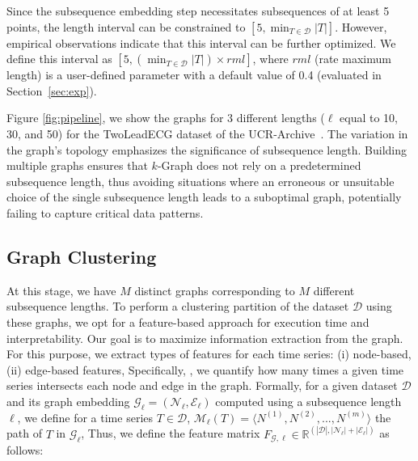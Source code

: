 Since the subsequence embedding step necessitates subsequences of at least 5 points, the length interval can be constrained to $[5, \min_{T \in \mathcal{D}} |T|]$. 
However, empirical observations indicate that this interval can be further optimized. We define this interval as $[5, ( \min_{T \in \mathcal{D}} |T|) \times rml]$, where $rml$ (rate maximum length) is a user-defined parameter with a default value of 0.4 
(evaluated in Section~\ref{sec:exp}).

Figure \ref{fig:pipeline}, we show the graphs for $3$ different lengths ($\ell$ equal to 10, 30, and 50) for the TwoLeadECG dataset of the UCR-Archive~\cite{Dau2018TheUT}. 
The variation in the graph's topology emphasizes the significance of subsequence length. 
Building multiple graphs ensures that $k$-Graph does not rely on a predetermined subsequence length, thus avoiding situations where an erroneous or unsuitable choice of the single subsequence length leads to a suboptimal graph, potentially failing to capture critical data patterns.


\subsection{Graph Clustering}
\label{sol:graphclustering}

At this stage, we have $M$ distinct graphs corresponding to $M$ different subsequence lengths. 
To perform a clustering partition of the dataset $\mathcal{D}$ using these graphs, we opt for a feature-based approach for execution time and interpretability. 
Our goal is to maximize information extraction from the graph. For this purpose, we extract  types of features for each time series: (i) node-based, (ii) edge-based features,  Specifically, , we quantify how many times a given time series intersects each node and edge in the graph. 
Formally, for a given dataset $\mathcal{D}$ and its graph embedding $\mathcal{G}_\ell=(\mathcal{N}_\ell,\mathcal{E}_\ell)$ computed using a subsequence length $\ell$, we define for a time series $T \in \mathcal{D}$, $\mathcal{M}_\ell(T) = \langle N^{(1)},N^{(2)},...,N^{(m)} \rangle$ the path of $T$ in $\mathcal{G}_\ell$,  
Thus, we define the feature matrix $F_{\mathcal{G},\ell} \in \mathbb{R}^{(|\mathcal{D}|,|\mathcal{N}_\ell|+|\mathcal{E}_\ell|)}$ as follows:

